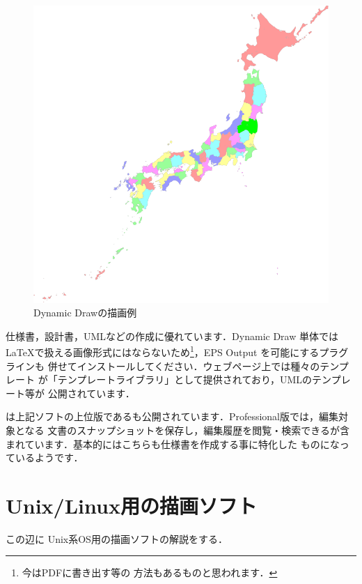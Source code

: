 \begin{figure}
 \centering
 \includegraphics[scale=.4]{images/DynamicDraw01-crop}
 \caption{Dynamic Drawの描画例}
\end{figure}

仕様書，設計書，UMLなどの作成に優れています．Dynamic Draw 単体では
\LaTeX で扱える画像形式にはならないため\footnote{今はPDFに書き出す等の
方法もあるものと思われます．}，EPS Output を可能にするプラグラインも
併せてインストールしてください．ウェブページ上では種々のテンプレート
が「テンプレートライブラリ」として提供されており，UMLのテンプレート等が
公開されています．

は上記ソフトの上位版であるも公開されています．Professional版では，編集対象となる
文書のスナップショットを保存し，編集履歴を閲覧・検索できるが含まれています．基本的にはこちらも仕様書を作成する事に特化した
ものになっているようです．


\section{Unix/Linux用の描画ソフト}

\begin{append}
 この辺に Unix系OS用の描画ソフトの解説をする．
\end{append}

